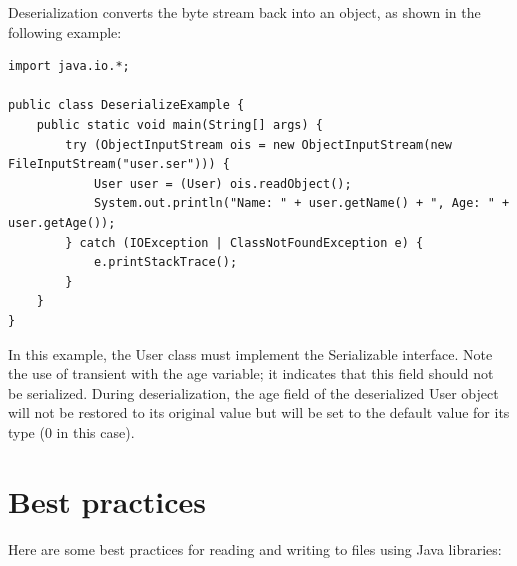 Deserialization converts the byte stream back into an object, as shown in the following example:

\begin{lstlisting}
import java.io.*;

public class DeserializeExample {
    public static void main(String[] args) {
        try (ObjectInputStream ois = new ObjectInputStream(new FileInputStream("user.ser"))) {
            User user = (User) ois.readObject();
            System.out.println("Name: " + user.getName() + ", Age: " + user.getAge());
        } catch (IOException | ClassNotFoundException e) {
            e.printStackTrace();
        }
    }
}
\end{lstlisting}

In this example, the User class must implement the Serializable interface. Note the use of transient with the age variable; it indicates that this field should not be serialized. During deserialization, the age field of the deserialized User object will not be restored to its original value but will be set to the default value for its type (0 in this case).






\section{Best practices}

Here are some best practices for reading and writing to files using Java libraries:

